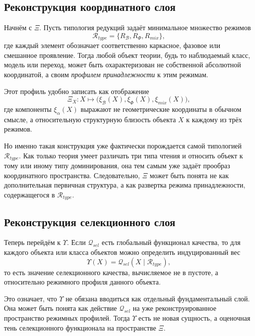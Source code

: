 \documentclass[12pt,a4paper]{article}
\begin{document}
\subsection{Реконструкция координатного слоя}

Начнём с \(\Xi\). Пусть типология редукций задаёт минимальное множество режимов
\begin{equation}
\mathcal{R}_{type}=\{R_{\mathcal{B}},R_{\Phi},R_{mix}\},
\end{equation}
где каждый элемент обозначает соответственно каркасное, фазовое или смешанное проявление. Тогда любой объект теории, будь то наблюдаемый класс, модель или переход, может быть охарактеризован не собственной абсолютной координатой, а своим \textit{профилем принадлежности} к этим режимам.

Этот профиль удобно записать как отображение
\begin{equation}
\Xi_X: X \longmapsto \bigl(\xi_{\mathcal{B}}(X),\xi_{\Phi}(X),\xi_{mix}(X)\bigr),
\end{equation}
где компоненты \(\xi_{\alpha}(X)\) выражают не геометрические координаты в обычном смысле, а относительную структурную близость объекта \(X\) к каждому из трёх режимов.

Но именно такая конструкция уже фактически порождается самой типологией \(\mathcal{R}_{type}\). Как только теория умеет различать три типа чтения и относить объект к тому или иному типу доминирования, она тем самым уже задаёт прообраз координатного пространства. Следовательно, \(\Xi\) может быть понята не как дополнительная первичная структура, а как развертка режима принадлежности, содержащегося в \(\mathcal{R}_{type}\).

\subsection{Реконструкция селекционного слоя}

Теперь перейдём к \(\Upsilon\). Если \(\mathcal{Q}_{sel}\) есть глобальный функционал качества, то для каждого объекта или класса объектов можно определить индуцированный вес
\begin{equation}
\Upsilon(X)=\mathcal{Q}_{sel}(X\mid \mathcal{R}_{type}),
\end{equation}
то есть значение селекционного качества, вычисляемое не в пустоте, а относительно режимного профиля данного объекта.

Это означает, что \(\Upsilon\) не обязана вводиться как отдельный фундаментальный слой. Она может быть понята как действие \(\mathcal{Q}_{sel}\) на уже реконструированное пространство режимных профилей. Тогда \(\Upsilon\) есть не новая сущность, а оценочная тень селекционного функционала на пространстве \(\Xi\).
\end{document}
